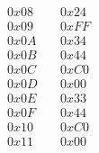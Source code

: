 \documentclass[hidelinks,12pt]{article}
\begin{document}
\begin{enumerate}
\begin{enumerate}
\begin{align*}
                    0x08 &\quad 0x24\\
                    0x09 &\quad 0xFF\tag{Load reg. 4 with bit pattern 0xFF}\\
                    0x0A &\quad 0x34\\
                    0x0B &\quad 0x44\tag{Store reg. 4 to mem. loc. 0x44}\\
                    0x0C &\quad 0xC0\\
                    0x0D &\quad 0x00\tag{Halt}\\
                    0x0E &\quad 0x33\\
                    0x0F &\quad 0x44\tag{Store reg. 3 to mem. loc. 0x44}\\
                    0x10 &\quad 0xC0\\
                    0x11 &\quad 0x00\tag{Halt}\\
                \end{align*}


\end{enumerate}
\end{enumerate}
\end{document}
